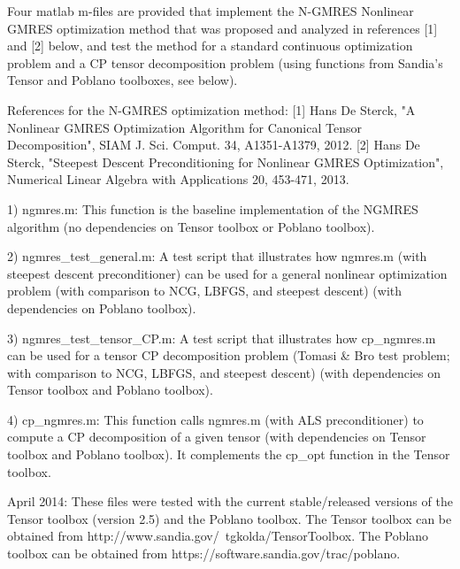 Four matlab m-files are provided that implement the N-GMRES Nonlinear GMRES optimization method that was proposed and analyzed in references [1] and [2] below, and test the method for a standard continuous optimization problem and a CP tensor decomposition problem (using functions from Sandia's Tensor and Poblano toolboxes, see below).

References for the N-GMRES optimization method:
   [1] Hans De Sterck, "A Nonlinear GMRES Optimization Algorithm for Canonical Tensor Decomposition", SIAM J. Sci. Comput. 34, A1351-A1379, 2012.
   [2] Hans De Sterck, "Steepest Descent Preconditioning for Nonlinear GMRES Optimization", Numerical Linear Algebra with Applications 20, 453-471, 2013.

1) ngmres.m:
This function is the baseline implementation of the NGMRES algorithm (no dependencies on Tensor toolbox or Poblano toolbox).

2) ngmres_test_general.m:
A test script that illustrates how ngmres.m (with steepest descent preconditioner) can be used for a general nonlinear optimization problem (with comparison to NCG, LBFGS, and steepest descent) (with dependencies on Poblano toolbox).

3) ngmres_test_tensor_CP.m:
A test script that illustrates how cp_ngmres.m can be used for a tensor CP decomposition problem (Tomasi & Bro test problem; with comparison to NCG, LBFGS, and steepest descent) (with dependencies on Tensor toolbox and Poblano toolbox).

4) cp_ngmres.m:
This function calls ngmres.m (with ALS preconditioner) to compute a CP decomposition of a given tensor (with dependencies on Tensor toolbox and Poblano toolbox). It complements the cp_opt function in the Tensor toolbox.

April 2014: These files were tested with the current stable/released versions of the Tensor toolbox (version 2.5) and the Poblano toolbox.
The Tensor toolbox can be obtained from http://www.sandia.gov/~tgkolda/TensorToolbox.
The Poblano toolbox can be obtained from https://software.sandia.gov/trac/poblano.

